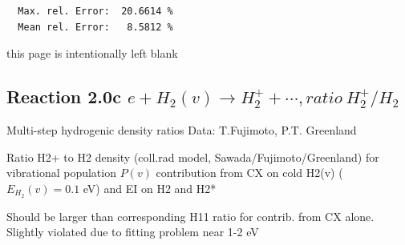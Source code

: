\documentclass[12pt,dvips]{article}
\begin{document}
\begin{small}
\begin{verbatim}
  Max. rel. Error:  20.6614 %
  Mean rel. Error:   8.5812 %

\end{verbatim}\end{small}
\newpage
this page is intentionally left blank
\texttt{}
\newpage

\subsection{
Reaction 2.0c   $e +  H_2(v) \rightarrow H_2^+ + \cdots , ratio \ H_2^+/H_2$
}
 Multi-step hydrogenic density ratios
 Data: T.Fujimoto, P.T. Greenland


  Ratio H2+ to H2 density
  (coll.rad model, Sawada/Fujimoto/Greenland) for vibrational population $P(v)$
  contribution from CX on cold H2(v) ($E_{H_2}(v)=0.1$ eV) and EI on H2 and H2*


Should be larger than corresponding H11 ratio for contrib. from CX alone.
Slightly violated due to fitting problem near 1-2 eV
\end{document}
